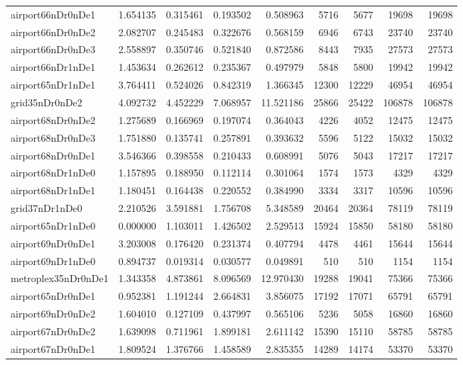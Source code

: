 \begin{longtable}{|l|r|r|r|r|r|r|r|r|}
airport66nDr0nDe1 & 1.654135 & 0.315461 & 0.193502 & 0.508963 & 5716 & 5677 & 19698 & 19698 \\
airport66nDr0nDe2 & 2.082707 & 0.245483 & 0.322676 & 0.568159 & 6946 & 6743 & 23740 & 23740 \\
airport66nDr0nDe3 & 2.558897 & 0.350746 & 0.521840 & 0.872586 & 8443 & 7935 & 27573 & 27573 \\
airport66nDr1nDe1 & 1.453634 & 0.262612 & 0.235367 & 0.497979 & 5848 & 5800 & 19942 & 19942 \\
airport65nDr1nDe1 & 3.764411 & 0.524026 & 0.842319 & 1.366345 & 12300 & 12229 & 46954 & 46954 \\
grid35nDr0nDe2 & 4.092732 & 4.452229 & 7.068957 & 11.521186 & 25866 & 25422 & 106878 & 106878 \\
airport68nDr0nDe2 & 1.275689 & 0.166969 & 0.197074 & 0.364043 & 4226 & 4052 & 12475 & 12475 \\
airport68nDr0nDe3 & 1.751880 & 0.135741 & 0.257891 & 0.393632 & 5596 & 5122 & 15032 & 15032 \\
airport68nDr0nDe1 & 3.546366 & 0.398558 & 0.210433 & 0.608991 & 5076 & 5043 & 17217 & 17217 \\
airport68nDr1nDe0 & 1.157895 & 0.188950 & 0.112114 & 0.301064 & 1574 & 1573 & 4329 & 4329 \\
airport68nDr1nDe1 & 1.180451 & 0.164438 & 0.220552 & 0.384990 & 3334 & 3317 & 10596 & 10596 \\
grid37nDr1nDe0 & 2.210526 & 3.591881 & 1.756708 & 5.348589 & 20464 & 20364 & 78119 & 78119 \\
airport65nDr1nDe0 & 0.000000 & 1.103011 & 1.426502 & 2.529513 & 15924 & 15850 & 58180 & 58180 \\
airport69nDr0nDe1 & 3.203008 & 0.176420 & 0.231374 & 0.407794 & 4478 & 4461 & 15644 & 15644 \\
airport69nDr1nDe0 & 0.894737 & 0.019314 & 0.030577 & 0.049891 & 510 & 510 & 1154 & 1154 \\
metroplex35nDr0nDe1 & 1.343358 & 4.873861 & 8.096569 & 12.970430 & 19288 & 19041 & 75366 & 75366 \\
airport65nDr0nDe1 & 0.952381 & 1.191244 & 2.664831 & 3.856075 & 17192 & 17071 & 65791 & 65791 \\
airport69nDr0nDe2 & 1.604010 & 0.127109 & 0.437997 & 0.565106 & 5236 & 5058 & 16860 & 16860 \\
airport67nDr0nDe2 & 1.639098 & 0.711961 & 1.899181 & 2.611142 & 15390 & 15110 & 58785 & 58785 \\
airport67nDr0nDe1 & 1.809524 & 1.376766 & 1.458589 & 2.835355 & 14289 & 14174 & 53370 & 53370 \\

\end{longtable}
